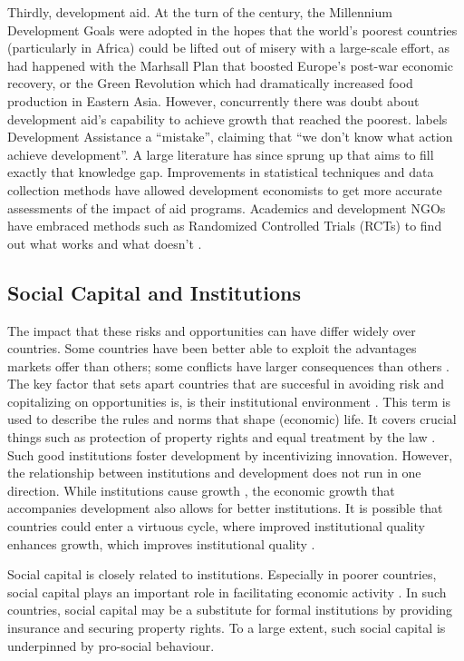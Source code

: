 Thirdly,  development aid. At the turn of the century, the Millennium Development Goals were adopted in the hopes that the world's poorest countries (particularly in Africa) could be lifted out of misery with a large-scale effort, as had happened with the Marhsall Plan that boosted Europe's post-war economic recovery, or the Green Revolution which had dramatically increased food production in Eastern Asia.   However, concurrently there was doubt about development aid's capability to achieve growth that reached the poorest. \citet{Easterly2007} labels Development Assistance a ``mistake'', claiming that ``we don't know what action achieve development''. A large literature has since sprung up that aims to fill exactly that knowledge gap. Improvements in statistical techniques and data collection methods have allowed development economists to get more accurate assessments of the impact of aid programs. Academics and development NGOs have embraced methods such as Randomized Controlled Trials (RCTs) to find out what works and what doesn't .   


\subsection{Social Capital and Institutions}
The impact that these risks and opportunities can have differ widely over countries. Some countries have been better able to exploit the advantages markets offer than others; some conflicts have larger consequences than others . The key factor that sets apart countries that are succesful in avoiding risk and copitalizing on opportunities is, is their institutional environment \citep{Rodrik2004,Acemoglu2000}. This term is used to describe the rules and norms that shape (economic) life. It covers crucial things such as protection of property rights and equal treatment by the law \citep{Acemoglu2005}. Such good institutions  foster development by incentivizing innovation. However, the relationship between institutions and development does not run in one direction. While institutions cause growth \citep{Acemoglu2000}, the economic growth that accompanies development also allows for better institutions. It is possible that countries could enter a virtuous cycle, where improved institutional quality enhances growth, which improves institutional quality \citep{Voors2011}.

%
Social capital is closely related to institutions.  Especially in poorer countries, social capital plays an important role in facilitating economic activity \citep{Knack1997}. In such countries, social capital may be a substitute for formal institutions by providing insurance and securing property rights. To a large extent, such social capital is underpinned by pro-social behaviour. 

